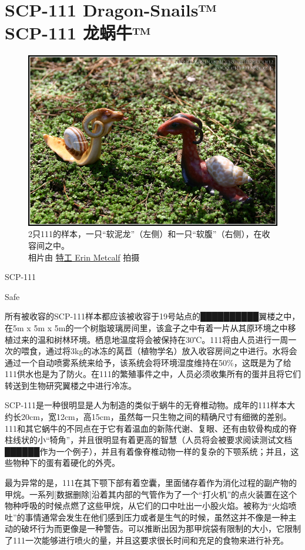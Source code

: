 \chapter[SCP-111 龙蜗牛™]{
    SCP-111 Dragon-Snails™\\
    SCP-111 龙蜗牛™
}

\label{chap:SCP-111}

\begin{figure}[H]
    \centering
    \includegraphics[width=0.5\linewidth]{images/SCP.111.jpg}
    \caption*{2只111的样本，一只“软泥龙”（左侧）和一只“软腹”（右侧），在收容间之中。\\相片由 \href{http://eirewolfcreations.deviantart.com/}{特工 Erin Metcalf} 拍摄}
\end{figure}

SCP-111

Safe

所有被收容的SCP-111样本都应该被收容于19号站点的██████████翼楼之中，在5m x 5m x 5m的一个树脂玻璃房间里，该盒子之中有着一片从其原环境之中移植过来的温和树林环境。栖息地温度将会被保持在30℃。111将由人员进行一周一次的喂食，通过将3kg的冰冻的莴苣（植物学名）放入收容房间之中进行。水将会通过一个自动喷雾系统来给予，该系统会将环境湿度维持在50\%，这既是为了给111供水也是为了防火。在111的繁殖事件之中，人员必须收集所有的蛋并且将它们转送到生物研究翼楼之中进行冷冻。

SCP-111是一种很明显是人为制造的类似于蜗牛的无脊椎动物。成年的111样本大约长20cm，宽12cm，高15cm，虽然每一只生物之间的精确尺寸有细微的差别。111和其它蜗牛的不同点在于它有着温血的新陈代谢、复眼、还有由软骨构成的脊柱线状的小“犄角”，并且很明显有着更高的智慧（人员将会被要求阅读测试文档██████作为一个例子），并且有着像脊椎动物一样的复杂的下颚系统；并且，这些物种下的蛋有着硬化的外壳。

最为异常的是，111在其下颚下部有着空囊，里面储存着作为消化过程的副产物的甲烷。一系列{[}数据删除]沿着其内部的气管作为了一个“打火机”的点火装置在这个物种呼吸的时候点燃了这些甲烷，从它们的口中吐出一小股火焰。被称为“火焰喷吐”的事情通常会发生在他们感到压力或者是生气的时候，虽然这并不像是一种主动的破坏行为而更像是一种警告。可以推断出因为那甲烷袋有限制的大小，它限制了111一次能够进行喷火的量，并且这要求很长时间和充足的食物来进行补充。

